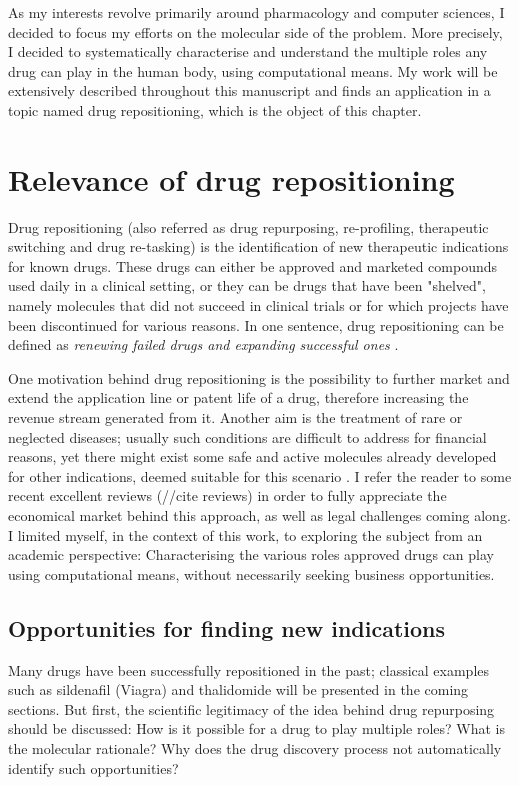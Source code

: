As my interests revolve primarily around pharmacology and computer sciences, I decided to focus my efforts on the molecular side of the problem. More precisely, I decided to systematically characterise and understand the multiple roles any drug can play in the human body, using computational means. My work will be extensively described throughout this manuscript and finds an application in a topic named drug repositioning, which is the object of this chapter.

\section{Relevance of drug repositioning}

Drug repositioning (also referred as drug repurposing, re-profiling, therapeutic switching and drug re-tasking) is the identification of new therapeutic indications for known drugs. These drugs can either be approved and marketed compounds used daily in a clinical setting, or they can be drugs that have been "shelved", namely molecules that did not succeed in clinical trials or for which projects have been discontinued for various reasons. In one sentence, drug repositioning can be defined as \emph{renewing failed drugs and expanding successful ones} \citep{barratt2012drug}.

One motivation behind drug repositioning is the possibility to further market and extend the application line or patent life of a drug, therefore increasing the revenue stream generated from it. Another aim is the treatment of rare or neglected diseases; usually such conditions are difficult to address for financial reasons, yet there might exist some safe and active molecules already developed for other indications, deemed suitable for this scenario \citep{men20101}. I refer the reader to some recent excellent reviews (//cite reviews) in order to fully appreciate the economical market behind this approach, as well as legal challenges coming along. I limited myself, in the context of this work, to exploring the subject from an academic perspective: Characterising the various roles approved drugs can play using computational means, without necessarily seeking business opportunities.

\subsection{Opportunities for finding new indications}
\label{sec:opp}

Many drugs have been successfully repositioned in the past; classical examples such as sildenafil (Viagra) and thalidomide will be presented in the coming sections. But first, the scientific legitimacy of the idea behind drug repurposing should be discussed: How is it possible for a drug to play multiple roles? What is the molecular rationale? Why does the drug discovery process not automatically identify such opportunities?

